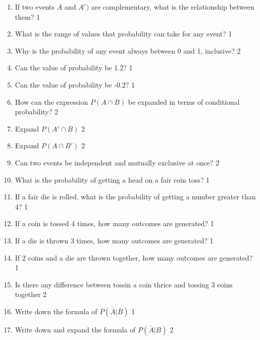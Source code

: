 \documentclass[a4paper,oneside, margin=1.4in]{book}
\begin{document}
\begin{enumerate}
\item If two events \( A \) and \( A^c) \) are complementary, what is the relationship between them? \hfill 1

\item What is the range of values that probability can take for any event? \hfill 1

\item Why is the probability of any event always between 0 and 1, inclusive? \hfill 2

\item Can the value of probability be 1.2? \hfill 1

\item Can the value of probability be -0.2? \hfill 1

\item How can the expression \( P(A \cap B) \) be expanded in terms of conditional probability? \hfill 2

\item Expand \( P(A' \cap B) \) \hfill 2

\item Expand \( P(A \cap B') \) \hfill 2

\item Can two events be independent and mutually exclusive at once? \hfill 2

\item What is the probability of getting a head on a fair coin toss? \hfill 1

\item If a fair die is rolled, what is the probability of getting a number greater than 4? \hfill 1

\item If a coin is tossed 4 times, how many outcomes are generated? \hfill 1

\item If a die is thrown 3 times, how many outcomes are generated? \hfill 1

\item If 2 coins and a die are thrown together, how many outcomes are generated? \hfill 1

\item Is there any difference between tossin a coin thrice and tossing 3 coins together \hfill 2

\item Write down the formula of $P(\bar A | \bar B)$ \hfill 1

\item Write down and expand the formula of $P(\bar A | B)$ \hfill 2


  \end{enumerate}
\end{document}
